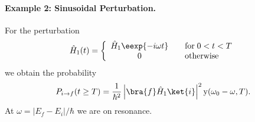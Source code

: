 \paragraph{Example 2: Sinusoidal Perturbation.}
For the perturbation
\begin{align}
\hat{H}_1(t) = \left\{ \begin{array}{ccl} \hat{H}_1\eexp{-i\omega t} && \text{for}\; 0 < t < T \\ 0 &&\text{otherwise}\end{array} \right.
\end{align}
we obtain the probability
\begin{align}
P_{i\to f} (t \geq T) = \frac{1}{\hbar^2} \left|\bra{f}\hat{H}_1\ket{i}\right|^2 \operatorname{y}(\omega_0 - \omega, T).
\end{align}
%
At $\omega = \left|E_f - E_i\right|/\hbar$ we are on resonance.

